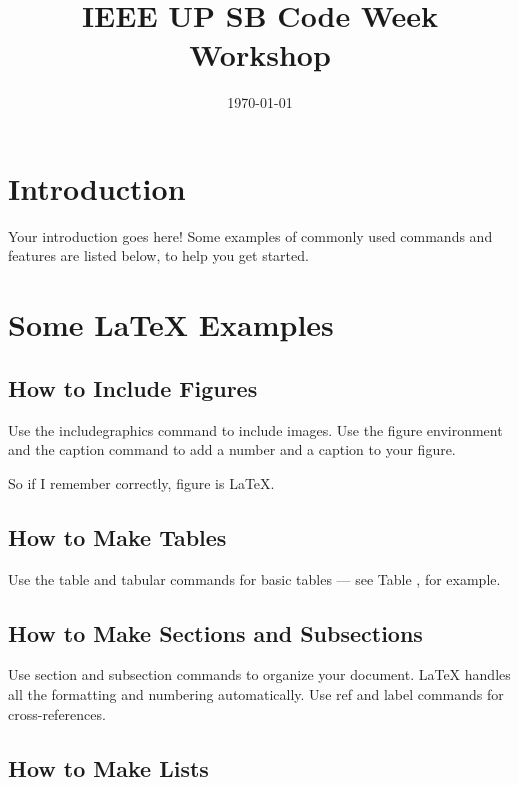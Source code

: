 \documentclass[a4paper]{article}
\title{IEEE UP SB Code Week Workshop}
\author{}%
\date{\today} %
\begin{document}
\maketitle


\section{Introduction}

Your introduction goes here! Some examples of commonly used commands and features are listed below, to help you get started.

\section{Some \LaTeX{} Examples}
\label{sec:examples}

\subsection{How to Include Figures}

Use the includegraphics command to include images. Use the figure environment and the caption command to add a number and a caption to your figure.

So if I remember correctly, figure  is \LaTeX{}.

\subsection{How to Make Tables}

Use the table and tabular commands for basic tables --- see Table , for example.


\subsection{How to Make Sections and Subsections}

Use section and subsection commands to organize your document. \LaTeX{} handles all the formatting and numbering automatically. Use ref and label commands for cross-references.

\subsection{How to Make Lists}
\end{document}

